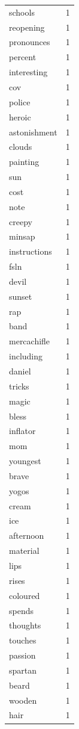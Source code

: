 \begin{tabular}{lr}
schools & 1 \\
reopening & 1 \\
pronounces & 1 \\
percent & 1 \\
interesting & 1 \\
cov & 1 \\
police & 1 \\
heroic & 1 \\
astonishment & 1 \\
clouds & 1 \\
painting & 1 \\
sun & 1 \\
cost & 1 \\
note & 1 \\
creepy & 1 \\
minsap & 1 \\
instructions & 1 \\
fsln & 1 \\
devil & 1 \\
sunset & 1 \\
rap & 1 \\
band & 1 \\
mercachifle & 1 \\
including & 1 \\
daniel & 1 \\
tricks & 1 \\
magic & 1 \\
bless & 1 \\
inflator & 1 \\
mom & 1 \\
youngest & 1 \\
brave & 1 \\
yogos & 1 \\
cream & 1 \\
ice & 1 \\
afternoon & 1 \\
material & 1 \\
lips & 1 \\
rises & 1 \\
coloured & 1 \\
spends & 1 \\
thoughts & 1 \\
touches & 1 \\
passion & 1 \\
spartan & 1 \\
beard & 1 \\
wooden & 1 \\
hair & 1 \\

\end{tabular}
